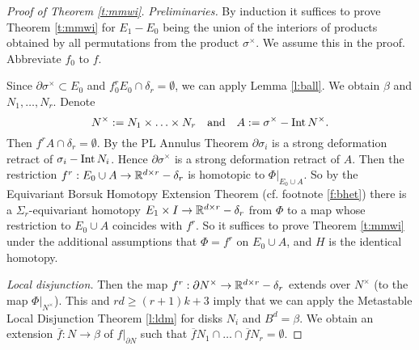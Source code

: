 \documentclass[12pt]{article}
\def\diag{\delta}
\def\Int{\mathop{\fam0 Int}}
\theoremstyle{plain}
\theoremstyle{definition}
\begin{document}
\begin{proof}[Proof of Theorem \ref{t:mmwi}]
{\it Preliminaries.}
By induction it suffices to prove Theorem \ref{t:mmwi} for $E_1-E_0$ being the union of the interiors of products obtained by all permutations from the product $\sigma^\times$.
We assume this in the proof.
Abbreviate $f_0$ to $f$.

Since $\partial\sigma^\times\subset E_0$ and $f_0^rE_0\cap\delta_r=\emptyset$,
we can apply Lemma \ref{l:ball}.
We obtain $\beta$ and $N_1,\ldots,N_r$.
Denote
$$N^\times:=N_1\times\ldots\times N_r \quad\text{and}\quad A:=\sigma^\times-\Int N^\times.$$
Then $f^rA\cap\delta_r=\emptyset$.
By the PL Annulus Theorem $\partial\sigma_i$ is a strong deformation retract of $\sigma_i-\Int N_i$.
Hence $\partial\sigma^\times$ is a strong deformation retract of $A$.
Then the restriction $f^r:E_0\cup A\to \R^{d\times r}-\diag_r$ is homotopic to $\Phi|_{E_0\cup A}$.
So by the Equivariant Borsuk Homotopy Extension Theorem (cf. footnote \ref{f:bhet}) there is a
$\Sigma_r$-equivariant homotopy
$E_1\times I\to\R^{d\times r}-\diag_r$ from $\Phi$ to a map whose restriction to $E_0\cup A$ coincides with $f^r$.
So it suffices to prove Theorem \ref{t:mmwi} under the additional assumptions that $\Phi=f^r$ on $E_0\cup A$, and $H$ is the identical homotopy.

\smallskip
{\it Local disjunction.}
Then the map $f^r:\partial N^\times\to\R^{d\times r}-\diag_r$ extends over $N^\times$
(to the map $\Phi|_{N^\times}$).
This and $rd\ge(r+1)k+3$ imply that we can apply the Metastable Local Disjunction Theorem \ref{l:ldm}
for disks $N_i$ and $B^d=\beta$.
We obtain an extension $\overline f:N\to\beta$ of $f|_{\partial N}$ such that
$\overline fN_1\cap\ldots\cap\overline fN_r=\emptyset$.



\end{proof}
\end{document}
